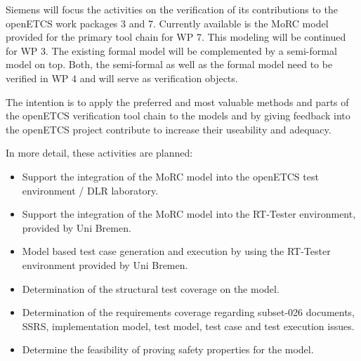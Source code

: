 
Siemens will focus the activities on the verification of its
contributions to the openETCS work packages 3 and 7. Currently
available is the MoRC model provided for the primary tool chain for WP
7. This modeling will be continued for WP 3. The existing formal model
will be complemented by a semi-formal model on top. Both, the
semi-formal as well as the formal model need to be verified in WP 4
and will serve as verification objects.

The intention is to apply the preferred and most valuable methods and
parts of the openETCS verification tool chain to the models and by
giving feedback into the openETCS project contribute to increase their
useability and adequacy.

In more detail, these activities are planned: 

\begin{itemize}
\item Support the integration of the MoRC model into the openETCS test
  environment / DLR laboratory.
\item Support the integration of the MoRC model into the RT-Tester
  environment, provided by Uni Bremen.
\item Model based test case generation and execution by using the
  RT-Tester environment provided by Uni Bremen.
\item Determination of the structural test coverage on the model.
\item Determination of the requirements coverage regarding subset-026
  documents, SSRS, implementation model, test model, test case and
  test execution issues.
\item Determine the feasibility of proving safety properties for the
  model.
\end{itemize}
